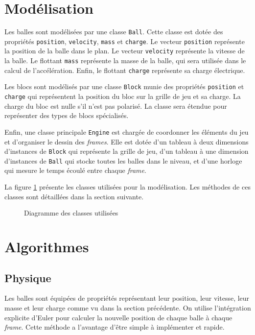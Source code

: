 \section{Modélisation}

Les balles sont modélisées par une classe \texttt{Ball}. Cette
classe est dotée des propriétés \texttt{position},
\texttt{velocity}, \texttt{mass} et \texttt{charge}.
Le vecteur \texttt{position} représente la position de la balle
dans le plan. Le vecteur \texttt{velocity} représente la
vitesse de la balle. Le flottant \texttt{mass} représente la masse
de la balle, qui sera utilisée dans le calcul de l'accélération.
Enfin, le flottant \texttt{charge} représente sa charge électrique.

Les blocs sont modélisés par une classe \texttt{Block} munie
des propriétés \texttt{position} et \texttt{charge}
qui représentent la position du bloc sur la grille de jeu et
sa charge. La charge du bloc est nulle s'il n'est pas polarisé.
La classe sera étendue pour représenter des types de
blocs spécialisés.

Enfin, une classe principale \texttt{Engine} est chargée de
coordonner les éléments du jeu
et d'organiser le dessin des \emph{frames}. Elle est
dotée d'un tableau à deux dimensions d'instances de
\texttt{Block} qui représente la grille de jeu,
d'un tableau à une dimension d'instances de \texttt{Ball}
qui stocke toutes les balles dans le niveau, et d'une
horloge qui mesure le temps écoulé entre chaque \emph{frame}.

La figure \ref{fig:ptf-uml-diagram} présente les classes
utilisées pour la modélisation. Les méthodes de ces classes
sont détaillées dans la section suivante.

\begin{figure}[h!]
    \centering
    
    \caption{Diagramme des classes utilisées}
    \label{fig:ptf-uml-diagram}
\end{figure}

\section{Algorithmes}
\label{section:ptf-algos}

\subsection{Physique}

Les balles sont équipées de propriétés représentant leur
position, leur vitesse, leur masse et leur charge comme
vu dans la section précédente. On utilise
l'intégration explicite d'Euler pour calculer la nouvelle
position de chaque balle à chaque \emph{frame}. \cite{ptf-euler}
Cette méthode a l'avantage d'être simple à implémenter et rapide.

